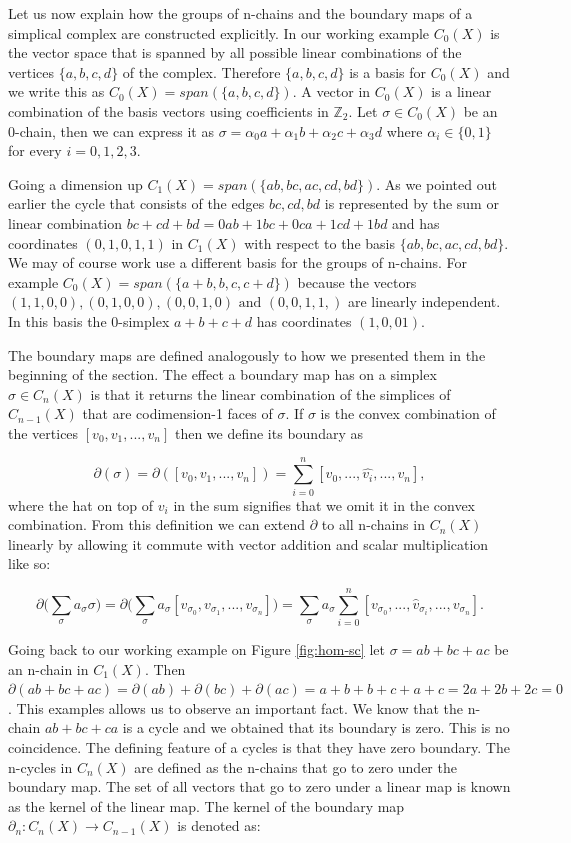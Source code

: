 Let us now explain how the groups of n-chains and the boundary maps of a simplical complex are constructed explicitly. In our working example $C_0(X)$ is the vector space that is spanned by all possible linear combinations of the vertices $\{a, b, c, d\}$ of the complex. Therefore $\{a, b, c, d\}$ is a basis for $C_0(X)$ and we write this as $C_0(X) = span(\{a, b, c, d\})$. A vector in $C_0(X)$ is a linear combination of the basis vectors using coefficients in $\mathbb{Z}_2$. Let $\sigma \in C_0(X)$ be an 0-chain, then we can express it as $\sigma  = \alpha_0a + \alpha_1b + \alpha_2c + \alpha_3d$ where $\alpha_i \in \{0 ,1\}$ for every $i = 0, 1, 2, 3$.

Going a dimension up $C_1(X) = span(\{ab, bc, ac, cd, bd\})$. As we pointed out earlier the cycle that consists of the edges $bc, cd, bd$ is represented by the sum or linear combination $bc + cd + bd = 0ab + 1bc + 0ca + 1cd + 1bd$ and has coordinates $(0, 1, 0, 1, 1)$ in $C_1(X)$ with respect to the basis $\{ab, bc, ac, cd, bd\}$. We may of course work use a different basis for the groups of n-chains. For example $C_0(X) = span(\{a + b, b, c, c + d\})$ because the vectors $(1, 1, 0, 0), (0, 1, 0, 0), (0, 0, 1, 0) \text { and } (0, 0, 1, 1,)$ are linearly independent. In this basis the 0-simplex $a + b + c + d$ has coordinates $(1, 0, 0 1)$.

The boundary maps are defined analogously to how we presented them in the beginning of the section. The effect a boundary map has on a simplex $\sigma \in C_n(X)$ is that it returns the linear combination of the simplices of $C_{n-1}(X)$ that are codimension-1 faces of $\sigma$. If $\sigma$ is the convex  combination of the vertices $[v_0, v_1, ..., v_n]$ then we define its boundary as

$$ \partial(\sigma) = \partial([v_0, v_1, ..., v_n]) = \sum_{i=0}^{n}[v_0, ... , \hat{v_i}, ..., v_n] ,$$
where the hat on top of $v_i$ in the sum signifies that we omit it in the convex combination. From this definition we can extend $\partial$ to all n-chains in $C_n(X)$ linearly by allowing it commute with vector addition and scalar multiplication like so:

$$ \partial\bigg(\sum_{\sigma}a_{\sigma}\sigma\bigg) = \partial\bigg(\sum_{\sigma}{a_{\sigma}[v_{\sigma_0}, v_{\sigma_1}, ..., v_{\sigma_n}]}\bigg) = \sum_{\sigma}{a_{\sigma} \sum_{i=0}^{n}[v_{\sigma_0},..., \hat{v}_{\sigma_i}, ..., v_{\sigma_n}]} .$$

Going back to our working example on Figure \ref{fig:hom-sc} let $\sigma = ab + bc + ac$ be an n-chain in $C_1(X)$. Then $\partial(ab + bc + ac) = \partial(ab) + \partial(bc) + \partial(ac) = a + b + b + c + a + c = 2a + 2b + 2c = 0$. This examples allows us to observe an important fact. We know that the n-chain $ab + bc + ca$ is a cycle and we obtained that its boundary is zero. This is no coincidence. The defining feature of a cycles is that they have zero boundary. The n-cycles in $C_{n}(X)$ are defined as the n-chains that go to zero under the boundary map. The set of all vectors that go to zero under a linear map is known as the kernel of the linear map. The kernel of the boundary map $\partial_n : C_{n}(X) \to C_{n-1}(X)$ is denoted as:


